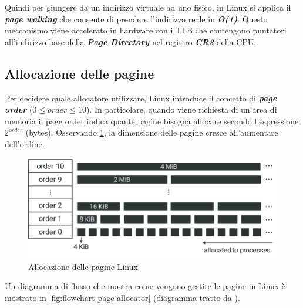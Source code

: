 \documentclass{article}
\begin{document}
Quindi per giungere da un indirizzo virtuale ad uno fisico, in Linux si applica il 
\textbf{\textit{page walking}} che consente di prendere l'indirizzo reale in \textbf{\textit{O(1)}}. 
Questo meccanismo viene accelerato in hardware con i TLB che contengono puntatori all'indirizzo 
base della \textbf{\textit{Page Directory}} nel registro \textbf{\textit{CR3}} della CPU.

\subsection{Allocazione delle pagine}
Per decidere quale allocatore utilizzare, Linux introduce il concetto di \textbf{\textit{page order}} 
($0 \leq order \leq 10$). In particolare, quando viene richiesta di un'area di memoria il 
page order indica quante pagine bisogna allocare secondo l'espressione $2^{order}$ (bytes). 
Osservando \cref{fig:order}, la dimensione delle 
pagine cresce all'aumentare dell'ordine.

\begin{figure}[h]
  \begin{center}
    \includegraphics[width=.75\textwidth]{figures/ch1/Memory-management-in-Linux-via-the-buddy-allocator-algorithm-Memory-spaces-are-divided.png}
  \end{center}
  \caption{Allocazione delle pagine Linux}\label{fig:order}
\end{figure}

Un diagramma di flusso che mostra come vengono gestite le pagine in Linux è mostrato 
in \cref{fig:flowchart-page-allocator} 
(diagramma tratto da \cite{NetfilterTablesVulnerability}).
\end{document}
